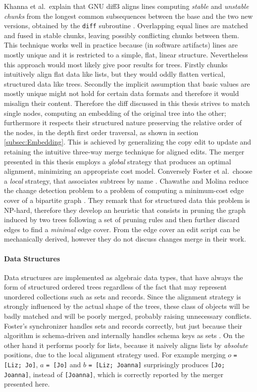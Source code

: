 \documentclass[../Thesis.tex]{subfiles}
\begin{document}
	Khanna et al.\ explain that GNU diff3 aligns lines
	computing \emph{stable} and \emph{unstable} \emph{chunks} from the 
	longest common subsequences between the base and the two new versions, 
	obtained by the \texttt{diff} subroutine \cite{PierceDiff3}.
	Overlapping equal lines are matched and fused in stable chunks, leaving 
	possibly conflicting chunks between them.
	This technique works well in practice because (in software artifacts) lines
	are mostly unique and it is restricted to a simple, flat, linear structure.
	Nevertheless this approach would most likely give poor results for trees. 
	Firstly chunks intuitively align flat data like lists,
	but they would oddly flatten vertical, structured data like trees.
	Secondly the implicit assumption that basic values are mostly
	unique might not hold for certain data formats and therefore it would 
	misalign their content.
	Therefore the diff discussed in this thesis strives to match single nodes,
	computing an embedding of the original tree into the other; furthermore
	it respects their structured nature preserving the relative order of the 
	nodes, in 	the depth first order traversal, as shown in section 
	\ref{subsec:Embedding}.
	This is achieved by generalizing the copy edit to update and retaining the
	intuitive three-way merge technique for aligned edits.
	The merger presented in this thesis employs a \emph{global} strategy
	that produces an optimal alignment, minimizing an appropriate cost model.
	Conversely Foster et al.\ choose a \emph{local} strategy,
	that associates subtrees by name \cite{Pierce07}.
	Chawathe and Molina reduce the change detection
	problem to a problem of computing a minimum-cost edge cover of 
	a bipartite graph \cite{Chawathe96}. 
	They remark that for structured data this problem
	is NP-hard, therefore they develop an heuristic that consists
	in pruning the graph induced by two trees following a set of pruning
	rules and then 	further discard edges to find a \emph{minimal} edge cover.
	From the edge cover an edit script can be mechanically derived, however
	they do not discuss changes merge in their work.
		
	\paragraph{Data Structures}
	Data structures are implemented as algebraic data types, that 
	have always the form of structured ordered trees
	regardless of the fact that may represent unordered collections such as 	
	sets and records. Since the alignment strategy is strongly influenced by 
	the actual shape of the trees, these class of objects will be 
	badly matched and will be poorly merged, probably raising 
	unnecessary conflicts.
	Foster's synchronizer handles sets and records 
	correctly, but just because their algorithm is 
	schema-driven and internally handles schema keys as sets \cite{Pierce07}.
	On the other hand it performs poorly for lists, 
	because it naively aligns lists by \emph{absolute} positions, due to the 
	local alignment strategy used. 
	For example merging $o$ \texttt{= [Liz; Jo]}, $a$ \texttt{= [Jo]} and $b$ 
	\texttt{= [Liz; Joanna]} surprisingly produces \texttt{[Jo; Joanna]}, instead
	of \texttt{[Joanna]}, 
	which is correctly reported by the merger presented here.
	
\end{document}

